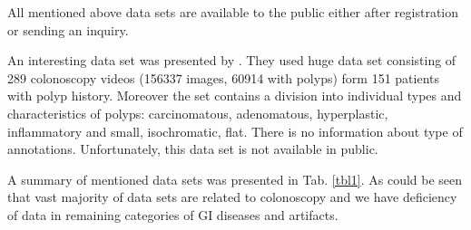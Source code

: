 \documentclass[preprint]{article}
\renewcommand{\onecolumn}{}
\newcommand{\tabletextsize}{\tiny}
\begin{document}
All mentioned above data sets are available to the public either after registration or sending an inquiry.

An interesting data set was presented by \cite{wang2017}. They used huge data set consisting of 289 colonoscopy videos (156337 images, 60914 with polyps) form 151 patients with polyp history. Moreover the set contains a division into individual types and characteristics of polyps: carcinomatous, adenomatous, hyperplastic, inflammatory and small, isochromatic, flat. There is no information about type of annotations. Unfortunately, this data set is not available in public.

A summary of mentioned data sets was presented in Tab. \ref{tbl1}. As could be seen that vast majority of data sets are related to colonoscopy and we have deficiency of data in remaining categories of GI diseases and artifacts. 

\newcommand{\longcell}{\pretolerance=10 \tolerance=5 \emergencystretch=0pt }



\onecolumn

\tabletextsize
\setlength\tabcolsep{2pt}
\end{document}
